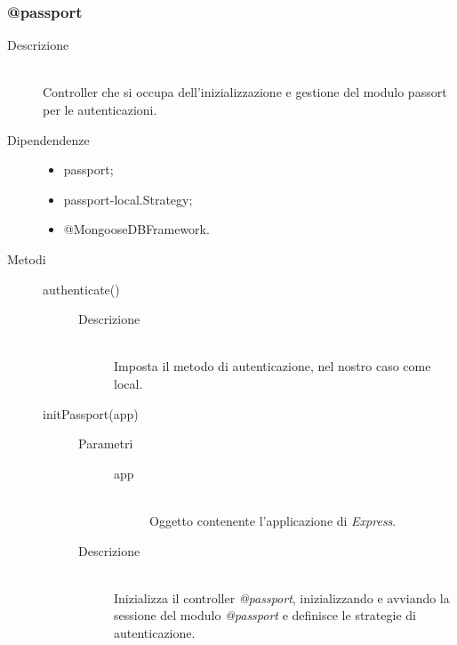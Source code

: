 \subsubsection{@passport}
\begin{description}
 \item[Descrizione] \hfill \\
Controller che si occupa dell'inizializzazione e gestione del modulo passort per le autenticazioni.
\item[Dipendendenze] \hfill
  \begin{itemize}
   \item passport;
   \item passport-local.Strategy;
   \item @MongooseDBFramework.
  \end{itemize}
   \item[Metodi] \hfill
    \begin{description}
     \item[authenticate()] \hfill 
      \begin{description}
        \item[Descrizione] \hfill \\
          Imposta il metodo di autenticazione, nel nostro caso come local.
      \end{description}
     
     \item[initPassport(app)] \hfill 
     \begin{description}
          \item[Parametri] \hfill
          \begin{description}
           \item[app] \hfill \\
           Oggetto contenente l'applicazione di \textit{Express}.
          \end{description}
          \item[Descrizione] \hfill \\
          Inizializza il controller \textit{@passport}, inizializzando e avviando la sessione del modulo \textit{@passport} e definisce le strategie di autenticazione.
            \end{description}
            

\end{description}
\end{description}
